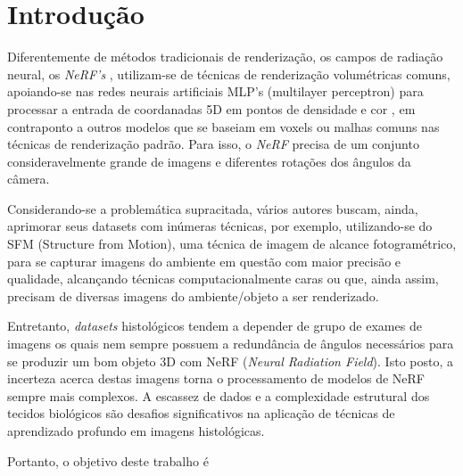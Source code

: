 \section{Introdução}
\label{sec:introducao}

Diferentemente de métodos tradicionais de renderização, os campos de radiação neural, os \textit{NeRF's} \cite{mildenhall2020nerfrepresentingscenesneural}, utilizam-se de técnicas de renderização volumétricas comuns, apoiando-se nas redes neurais artificiais MLP's (multilayer perceptron) \cite{GARDNER19982627} para processar a entrada de coordanadas 5D em pontos de densidade e cor \cite{mildenhall2020nerfrepresentingscenesneural}, em contraponto a outros modelos que se baseiam em voxels ou malhas comuns nas técnicas de renderização padrão. Para isso, o \textit{NeRF} precisa de um conjunto consideravelmente grande de imagens e diferentes rotações dos ângulos da câmera.

Considerando-se a problemática supracitada, vários autores buscam, ainda, aprimorar seus datasets com inúmeras técnicas, por exemplo, utilizando-se do SFM (Structure from Motion), uma técnica de imagem de alcance fotogramétrico, para se capturar imagens do ambiente em questão com maior precisão e qualidade, alcançando técnicas computacionalmente caras ou que, ainda assim, precisam de diversas imagens do ambiente/objeto a ser renderizado\cite{kerbl3Dgaussians}.

Entretanto, \textit{datasets} histológicos tendem a depender de grupo de exames de imagens os quais nem sempre possuem a redundância de ângulos necessários para se produzir um bom objeto 3D com NeRF (\textit{Neural Radiation Field})\cite{mildenhall2020nerfrepresentingscenesneural}. Isto posto, a incerteza acerca destas imagens torna o processamento de modelos de NeRF sempre mais complexos. A escassez de dados e a complexidade estrutural dos tecidos biológicos são desafios significativos na aplicação de técnicas de aprendizado profundo em imagens histológicas.  

Portanto, o objetivo deste trabalho é
